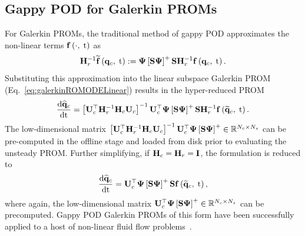 \subsection{Gappy POD for Galerkin PROMs}\label{subsec:gappyGalerkin}
%
For Galerkin PROMs, the traditional method of gappy POD approximates the non-linear terms $\mathbf{f} \left(\cdot, \; \text{t}\right)$ as
%
\begin{equation}
	\resScaleInv \rhsApproxFunc{\consVec, \; \timeVar} \defEq \deimBasis \left[ \sampMat \deimBasis \right]^+ \sampMat \resScaleInv \rhsFunc{\consVec, \; \timeVar}.
\end{equation}
%
Substituting this approximation into the linear subspace Galerkin PROM (Eq.~\ref{eq:galerkinROMODELinear}) results in the hyper-reduced PROM
%
\begin{equation}\label{eq:galerkinROMHR}
    \ode{\consVecCoef}{\timeVar} = \left[\consTrial^\top \resScaleInv \consScale \consTrial\right]^{-1} \consTrial^\top \deimBasis \left[ \sampMat \deimBasis \right]^+ \sampMat \resScaleInv \rhsFunc{\consVecRom, \; \timeVar}.
\end{equation}
%
The low-dimensional matrix $\left[\consTrial^\top \resScaleInv \consScale \consTrial\right]^{-1} \consTrial^\top \deimBasis \left[ \sampMat \deimBasis \right]^+ \inRTwo{\numConsModes}{\numSamps}$ can be pre-computed in the offline stage and loaded from disk prior to evaluating the unsteady PROM. Further simplifying, if $\consScale = \resScale = \identMat$, the formulation is reduced to
%
\begin{equation}
    \ode{\consVecCoef}{\timeVar} = \consTrial^\top \deimBasis \left[ \sampMat \deimBasis \right]^+ \sampMat \rhsFunc{\consVecRom, \; \timeVar},
\end{equation}
%
where again, the low-dimensional matrix $\consTrial^\top \deimBasis \left[ \sampMat \deimBasis \right]^+ \inRTwo{\numConsModes}{\numSamps}$ can be precomputed. Gappy POD Galerkin PROMs of this form have been successfully applied to a host of non-linear fluid flow problems~\cite{Chaturantabut2011,Stefanescu2013,Wirtz2014,Amsallem2015,Alla2017}.

